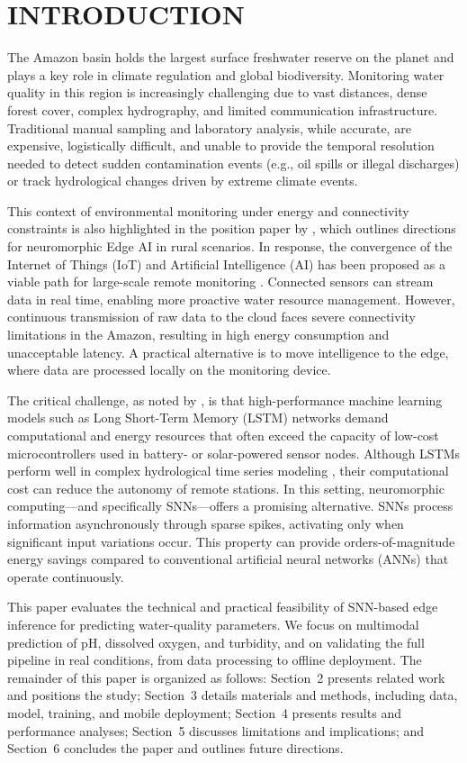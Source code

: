 \section{INTRODUCTION}

The Amazon basin holds the largest surface freshwater reserve on the planet and plays a key role in
climate regulation and global biodiversity. Monitoring water quality in this region is increasingly
challenging due to vast distances, dense forest cover, complex hydrography, and limited communication
infrastructure. Traditional manual sampling and laboratory analysis, while accurate, are expensive,
logistically difficult, and unable to provide the temporal resolution needed to detect sudden
contamination events (e.g., oil spills or illegal discharges) or track hydrological changes driven
by extreme climate events.

This context of environmental monitoring under energy and connectivity constraints is also
highlighted in the position paper by , which outlines directions for neuromorphic
Edge AI in rural scenarios. In response, the convergence of the Internet of Things (IoT) and
Artificial Intelligence (AI) has been proposed as a viable path for large-scale remote monitoring
\cite{rahu2023}. Connected sensors can stream data in real time, enabling more proactive water
resource management. However, continuous transmission of raw data to the cloud faces severe
connectivity limitations in the Amazon, resulting in high energy consumption and unacceptable
latency. A practical alternative is to move intelligence to the edge, where data are processed
locally on the monitoring device.

The critical challenge, as noted by , is that high-performance machine learning
models such as Long Short-Term Memory (LSTM) networks demand computational and energy resources that
often exceed the capacity of low-cost microcontrollers used in battery- or solar-powered sensor
nodes. Although LSTMs perform well in complex hydrological time series modeling \cite{pyo2023}, their
computational cost can reduce the autonomy of remote stations. In this setting, neuromorphic
computing—and specifically SNNs—offers a promising alternative. SNNs process information asynchronously
through sparse spikes, activating only when significant input variations occur. This property can
provide orders-of-magnitude energy savings compared to conventional artificial neural networks (ANNs)
that operate continuously.

This paper evaluates the technical and practical feasibility of SNN-based edge inference for
predicting water-quality parameters. We focus on multimodal prediction of pH, dissolved oxygen, and
turbidity, and on validating the full pipeline in real conditions, from data processing to offline
deployment. The remainder of this paper is organized as follows: Section~2 presents related work and
positions the study; Section~3 details materials and methods, including data, model, training, and
mobile deployment; Section~4 presents results and performance analyses; Section~5 discusses
limitations and implications; and Section~6 concludes the paper and outlines future directions.

